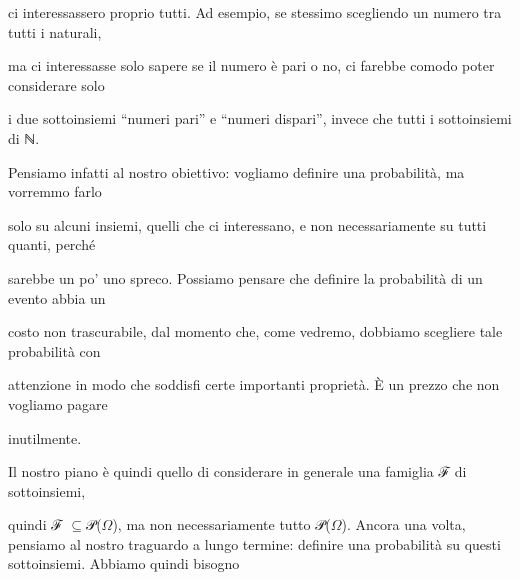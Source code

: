\documentclass[a4paper,portrait,12pt]{article}
\begin{document}
\begin{flushleft}
ci interessassero proprio tutti. Ad esempio, se stessimo scegliendo un numero tra tutti i naturali,
\end{flushleft}


\begin{flushleft}
ma ci interessasse solo sapere se il numero \`{e} pari o no, ci farebbe comodo poter considerare solo
\end{flushleft}


\begin{flushleft}
i due sottoinsiemi {``}numeri pari'' e {``}numeri dispari'', invece che tutti i sottoinsiemi di ℕ.
\end{flushleft}


\begin{flushleft}
Pensiamo infatti al nostro obiettivo: vogliamo definire una probabilit\`{a}, ma vorremmo farlo
\end{flushleft}


\begin{flushleft}
solo su alcuni insiemi, quelli che ci interessano, e non necessariamente su tutti quanti, perch\'{e}
\end{flushleft}


\begin{flushleft}
sarebbe un po' uno spreco. Possiamo pensare che definire la probabilit\`{a} di un evento abbia un
\end{flushleft}


\begin{flushleft}
costo non trascurabile, dal momento che, come vedremo, dobbiamo scegliere tale probabilit\`{a} con
\end{flushleft}


\begin{flushleft}
attenzione in modo che soddisfi certe importanti propriet\`{a}. \`{E} un prezzo che non vogliamo pagare
\end{flushleft}


\begin{flushleft}
inutilmente.
\end{flushleft}


\begin{flushleft}
Il nostro piano \`{e} quindi quello di considerare in generale una famiglia ℱ di sottoinsiemi,
\end{flushleft}


\begin{flushleft}
quindi ℱ $\subseteq$𝒫($\Omega$), ma non necessariamente tutto 𝒫($\Omega$). Ancora una volta, pensiamo al nostro traguardo a lungo termine: definire una probabilit\`{a} su questi sottoinsiemi. Abbiamo quindi bisogno
\end{flushleft}
\end{document}

